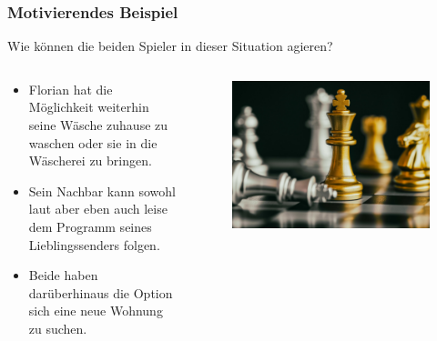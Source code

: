 \documentclass{beamer}
\begin{document}
        \begin{frame}
            \frametitle{Motivierendes Beispiel}
            Wie können die beiden Spieler in dieser Situation agieren?
            \begin{columns}
                \begin{column}{0.55\textwidth}
                    \begin{itemize}
                        \item Florian hat die Möglichkeit weiterhin seine Wäsche zuhause zu waschen oder sie in die Wäscherei
                            zu bringen.
                        \item Sein Nachbar kann sowohl laut aber eben auch leise dem Programm seines Lieblingssenders folgen. 
                        \item Beide haben darüberhinaus die Option sich eine neue Wohnung zu suchen.
                    \end{itemize}        
                \end{column}
                \begin{column}{0.35\textwidth}
                    \begin{figure}
                        \includegraphics[scale = 0.045]{images/strategy_chess.jpg}
                    \end{figure}
                \end{column}
            \end{columns}
        \end{frame}
\end{document}
